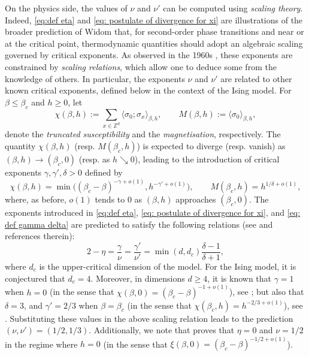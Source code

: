 \documentclass[11pt,a4paper]{article}
\numberwithin{equation}{section}
\theoremstyle{plain}
\theoremstyle{definition}
\begin{document}
On the physics side, the values of $\nu$ and $\nu'$ can be computed using \emph{scaling theory}. Indeed, \eqref{eq:def eta} and \eqref{eq: postulate of divergence for xi} are illustrations of the broader prediction of Widom \cite{Widom1965equation} that, for second-order phase transitions and near or at the critical point, thermodynamic quantities should adopt an algebraic scaling governed by critical exponents. As observed in the 1960s \cite{Fisher1964correlation,EssamFisher1963pade}, these exponents are constrained by \emph{scaling relations}, which allow one to deduce some from the knowledge of others. In particular, the exponents $\nu$ and $\nu'$ are related to other known critical exponents, defined below in the context of the Ising model. For $\beta\leq \beta_c$ and $h\geq 0$, let
\begin{equation}
	\chi(\beta,h):=\sum_{x\in \mathbb Z^d}\langle \sigma_0;\sigma_x\rangle_{\beta,h}, \qquad M(\beta,h):=\langle \sigma_0\rangle_{\beta,h},
\end{equation}
denote the \emph{truncated susceptibility} and the \emph{magnetisation}, respectively. The quantity $\chi(\beta,h)$ (resp. $M(\beta_c,h)$) is expected to diverge (resp. vanish) as $(\beta,h)\to (\beta_c,0)$ (resp. as $h\searrow 0$), leading to the introduction of critical exponents $\gamma,\gamma',\delta>0$ defined by
\begin{equation}\label{eq: def gamma delta}
	\chi(\beta,h)=\min\bigl((\beta_c-\beta)^{-\gamma+o(1)},h^{-\gamma'+o(1)}\bigr), \qquad M(\beta_c,h)=h^{1/\delta+o(1)},
\end{equation}
where, as before, $o(1)$ tends to $0$ as $(\beta,h)$ approaches $(\beta_c,0)$. The exponents introduced in \eqref{eq:def eta}, \eqref{eq: postulate of divergence for xi}, and \eqref{eq: def gamma delta} are predicted to satisfy the following relations (see \cite{Fisher1998renormalization,DuminilreviewIsing} and references therein):
\begin{equation}\label{eq:scaling relation}
	2-\eta=\frac{\gamma}{\nu}=\frac{\gamma'}{\nu'}=\min(d,d_c)\frac{\delta-1}{\delta+1},
\end{equation}
where $d_c$ is the upper-critical dimension of the model. For the Ising model, it is conjectured that $d_c=4$. Moreover, in dimensions $d\geq 4$, it is known that $\gamma=1$ when $h=0$ (in the sense that $\chi(\beta,0)=(\beta_c-\beta)^{-1+o(1)}$), see \cite{AizenmanGeometricAnalysis1982,AizenmanGrahamRenormalizedCouplingSusceptibility4d1983}; but also that $\delta=3$, and $\gamma'=2/3$ when $\beta=\beta_c$ (in the sense that $\chi(\beta_c,h)=h^{-2/3+o(1)}$), see \cite{AizenmanFernandezCriticalBehaviorMagnetization1986}. Substituting these values in the above scaling relation leads to the prediction $(\nu,\nu')=(1/2,1/3)$. Additionally, we note that \cite{DuminilPanis2024newLB} proves that $\eta=0$ and $\nu=1/2$ in the regime where $h=0$ (in the sense that $\xi(\beta,0)=(\beta_c-\beta)^{-1/2+o(1)}$).
\end{document}
